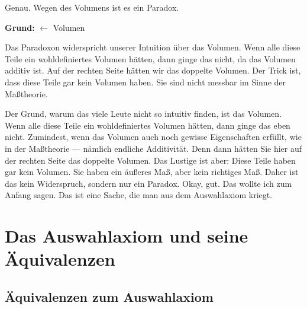 \begin{spoken-clean}[continued]
Genau. Wegen des Volumens ist es ein Paradox.
\end{spoken-clean}

\begin{math-stroke}
\textbf{Grund:} $\leftarrow$ Volumen

\begin{explanation-of-steps}
Das Paradoxon widerspricht unserer Intuition über das Volumen. Wenn alle diese Teile ein wohldefiniertes Volumen hätten, dann ginge das nicht, da das Volumen additiv ist. Auf der rechten Seite hätten wir das doppelte Volumen. Der Trick ist, dass diese Teile gar kein Volumen haben. Sie sind nicht messbar im Sinne der Maßtheorie.
\end{explanation-of-steps}
\end{math-stroke}

\begin{spoken-clean}[00:06:52 - 00:07:30]
Der Grund, warum das viele Leute nicht so intuitiv finden, ist das Volumen. Wenn alle diese Teile ein wohldefiniertes Volumen hätten, dann ginge das eben nicht. Zumindest, wenn das Volumen auch noch gewisse Eigenschaften erfüllt, wie in der Maßtheorie --- nämlich endliche Additivität. Denn dann hätten Sie hier auf der rechten Seite das doppelte Volumen. Das Lustige ist aber: Diese Teile haben gar kein Volumen. Sie haben ein äußeres Maß, aber kein richtiges Maß. Daher ist das kein Widerspruch, sondern nur ein Paradox. Okay, gut. Das wollte ich zum Anfang sagen. Das ist eine Sache, die man aus dem Auswahlaxiom kriegt.
\end{spoken-clean}

\section{Das Auswahlaxiom und seine Äquivalenzen}

\subsection{Äquivalenzen zum Auswahlaxiom}

